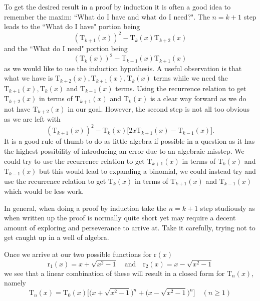 \documentclass{article}
\begin{document}
\quad To get the desired result in a proof by induction it is often a good idea to remember the maxim: ``What do I have and what do I need?". The $n=k+1$ step leads to the ``What do I have" portion being
\begin{equation*}
\left(\mathrm{T}_{k+1}(x)\right)^2 - \mathrm{T}_{k}(x) \mathrm{T}_{k+2}(x)
\end{equation*}
and the ``What do I need" portion being
\begin{equation*}
\left(\mathrm{T}_{k}(x)\right)^2 - \mathrm{T}_{k-1}(x) \mathrm{T}_{k+1}(x)
\end{equation*}
as we would like to use the induction hypothesis. A useful observation is that what we have is $\mathrm{T}_{k+2}(x),\mathrm{T}_{k+1}(x),\mathrm{T}_{k}(x)$ terms while we need the $\mathrm{T}_{k+1}(x),\mathrm{T}_{k}(x)$ and $\mathrm{T}_{k-1}(x)$ terms. Using the recurrence relation to get $\mathrm{T}_{k+2}(x)$ in terms of $\mathrm{T}_{k+1}(x)$ and $\mathrm{T}_{k}(x)$ is a clear way forward as we do not have $\mathrm{T}_{k+2}(x)$ in our goal. However, the second step is not all too obvious as we are left with
\begin{equation*}
\left(\mathrm{T}_{k+1}(x)\right)^2 - \mathrm{T}_{k}(x)\Big[2x\mathrm{T}_{k+1}(x) -\mathrm{T}_{k-1}(x)\Big].
\end{equation*}
It is a good rule of thumb to do as little algebra if possible in a question as it has the highest possibility of introducing an error due to an algebraic misstep. We could try to use the recurrence relation to get $\mathrm{T}_{k+1}(x)$ in terms of $\mathrm{T}_{k}(x)$ and $\mathrm{T}_{k-1}(x)$ but this would lead to expanding a binomial, we could instead try and use the recurrence relation to get $\mathrm{T}_{k}(x)$ in terms of $\mathrm{T}_{k+1}(x)$ and $\mathrm{T}_{k-1}(x)$ which would be less work.\par

\quad In general, when doing a proof by induction take the $n=k+1$ step studiously as when written up the proof is normally quite short yet may require a decent amount of exploring and perseverance to arrive at. Take it carefully, trying not to get caught up in a well of algebra.

Once we arrive at our two possible functions for $\mathrm{r}(x)$
\begin{equation*}
\mathrm{r}_1(x) = x + \sqrt{x^2-1} \quad \text{and} \quad \mathrm{r}_2(x) = x - \sqrt{x^2-1}
\end{equation*}
we see that a linear combination of these will result in a closed form for $\mathrm{T}_n(x)$, namely
\begin{equation*}
\mathrm{T}_n(x) = \mathrm{T_0}(x) \Big[\Big(x + \sqrt{x^2-1}\Big)^n + \Big(x - \sqrt{x^2-1}\Big)^n\Big] \quad (n \geq 1)
\end{equation*}
\end{document}
